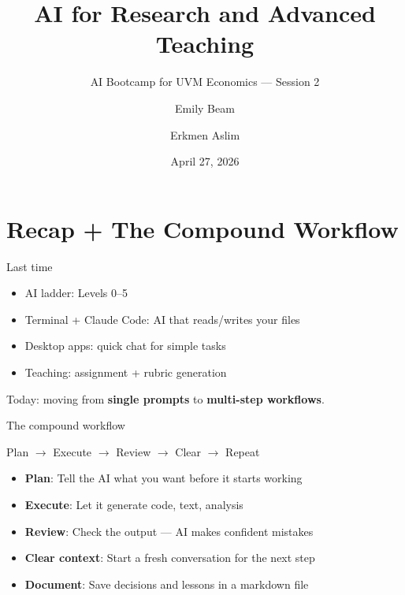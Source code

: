 \documentclass[aspectratio=169]{beamer}
\title{AI for Research and Advanced Teaching}
\subtitle{AI Bootcamp for UVM Economics --- Session 2}
\author{Emily Beam \and Erkmen Aslim}
\date{April 27, 2026}
\institute{Department of Economics, University of Vermont}
\begin{document}
\maketitle

\section{Recap + The Compound Workflow}

\begin{frame}{Last time}
\begin{itemize}
    \item AI ladder: Levels 0--5
    \item Terminal + Claude Code: AI that reads/writes your files
    \item Desktop apps: quick chat for simple tasks
    \item Teaching: assignment + rubric generation
\end{itemize}

\bigskip
Today: moving from \textbf{single prompts} to \textbf{multi-step workflows}.
\end{frame}

\begin{frame}{The compound workflow}
\begin{center}
\Large
Plan $\rightarrow$ Execute $\rightarrow$ Review $\rightarrow$ Clear $\rightarrow$ Repeat
\end{center}

\bigskip
\begin{itemize}
    \item \textbf{Plan}: Tell the AI what you want before it starts working
    \item \textbf{Execute}: Let it generate code, text, analysis
    \item \textbf{Review}: Check the output --- AI makes confident mistakes
    \item \textbf{Clear context}: Start a fresh conversation for the next step
    \item \textbf{Document}: Save decisions and lessons in a markdown file
\end{itemize}
\end{frame}
\end{document}
